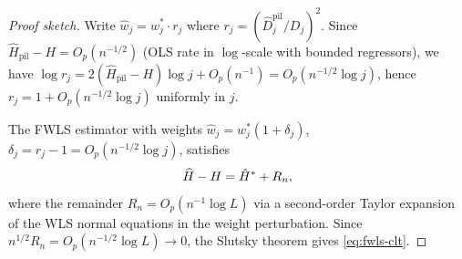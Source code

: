 \begin{proof}[Proof sketch]
Write $\hat w_j = w_j^* \cdot r_j$ where $r_j = (\hat D_j^{\mathrm{pil}}
/ D_j)^2$.  Since $\hat H_{\mathrm{pil}} - H = O_p(n^{-1/2})$ (OLS
rate in $\log$-scale with bounded regressors), we have
$\log r_j = 2(\hat H_{\mathrm{pil}} - H)\log j + O_p(n^{-1}) = O_p(n^{-1/2}\log j)$,
hence $r_j = 1 + O_p(n^{-1/2}\log j)$ uniformly in $j$.

The FWLS estimator with weights $\hat w_j = w_j^*(1 + \delta_j)$,
$\delta_j = r_j - 1 = O_p(n^{-1/2}\log j)$, satisfies
\[
    \widehat{H} - H = \hat H^* + R_n,
\]
where the remainder $R_n = O_p(n^{-1}\log L)$ via a second-order
Taylor expansion of the WLS normal equations in the weight perturbation.
Since $n^{1/2} R_n = O_p(n^{-1/2}\log L) \to 0$, the Slutsky theorem
gives \eqref{eq:fwls-clt}.
\end{proof}
